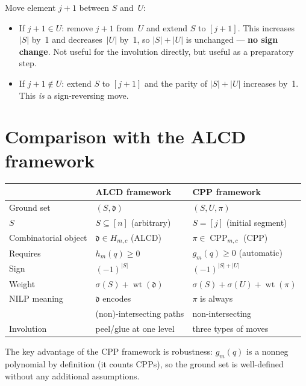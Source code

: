 \documentclass[11pt]{article}
\newcommand{\CPP}{\operatorname{CPP}}
\DeclareMathOperator{\wt}{wt}
\theoremstyle{plain}
\theoremstyle{definition}
\begin{document}
Move element $j+1$ between $S$ and~$U$:
\begin{itemize}
  \item If $j+1 \in U$: remove $j+1$ from~$U$ and
    extend $S$ to $[j+1]$.  This increases~$|S|$ by~1
    and decreases~$|U|$ by~1, so $|S|+|U|$ is unchanged
    --- \textbf{no sign change}.  Not useful for the
    involution directly, but useful as a preparatory step.
  \item If $j+1 \notin U$: extend $S$ to $[j+1]$ and
    the parity of $|S|+|U|$ increases by~1.  This \emph{is}
    a sign-reversing move.
\end{itemize}


\section{Comparison with the ALCD framework}
\label{sec:comparison}

\begin{center}
\begin{tabular}{lll}
  \hline
  & \textbf{ALCD framework} & \textbf{CPP framework} \\
  \hline
  Ground set & $(S, \mathfrak{d})$
    & $(S, U, \pi)$ \\[2pt]
  $S$ & $S \subseteq [n]$ (arbitrary)
    & $S = [j]$ (initial segment) \\[2pt]
  Combinatorial object
    & $\mathfrak{d} \in H_{m,c}$ (ALCD)
    & $\pi \in \CPP_{m,c}$ (CPP) \\[2pt]
  Requires & $h_m(q) \geq 0$
    & $g_m(q) \geq 0$ (automatic) \\[2pt]
  Sign & $(-1)^{|S|}$
    & $(-1)^{|S| + |U|}$ \\[2pt]
  Weight & $\sigma(S) + \wt(\mathfrak{d})$
    & $\sigma(S) + \sigma(U) + \wt(\pi)$ \\[2pt]
  NILP meaning & $\mathfrak{d}$ encodes
    & $\pi$ is always \\
  & (non)-intersecting paths
    & non-intersecting \\[2pt]
  Involution & peel/glue at one level
    & three types of moves \\
  \hline
\end{tabular}
\end{center}

The key advantage of the CPP framework is robustness:
$g_m(q)$ is a nonneg polynomial by definition (it counts
CPPs), so the ground set is well-defined without any
additional assumptions.
\end{document}
